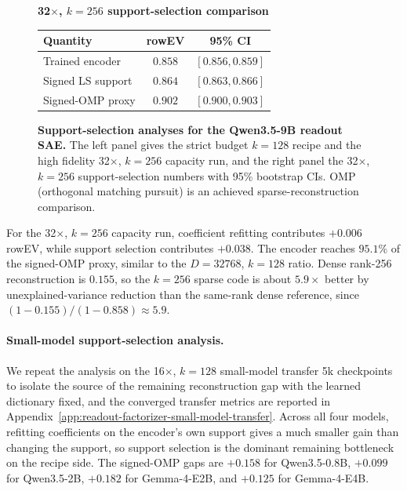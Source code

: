 \begin{figure}[!tbp]
    \centering
    \begin{minipage}[t]{0.60\textwidth}
        \vspace{0pt}
        \centering
    \end{minipage}\hfill
    \begin{minipage}[t]{0.35\textwidth}
        \vspace{0pt}
        \centering
        \scriptsize
        \setlength{\tabcolsep}{4pt}
        \renewcommand{\arraystretch}{1.08}
        \textbf{32$\times$, $k=256$ support-selection comparison}\par\vspace{2pt}
        \begin{tabular}{@{}lcc@{}}
        \toprule
        Quantity & rowEV & 95\% CI \\
        \midrule
        Trained encoder & $0.858$ & $[0.856, 0.859]$ \\
        Signed LS support & $0.864$ & $[0.863, 0.866]$ \\
        Signed-OMP proxy & $0.902$ & $[0.900, 0.903]$ \\
        \bottomrule
        \end{tabular}
    \end{minipage}
    \caption{
        \textbf{Support-selection analyses for the Qwen3.5-9B readout SAE.}
        The left panel gives the strict budget $k=128$ recipe and the high fidelity
        32$\times$, $k=256$ capacity run, and the right panel the 32$\times$, $k=256$
        support-selection numbers with 95\% bootstrap CIs. OMP (orthogonal matching pursuit)
        is an achieved sparse-reconstruction comparison.
    }
    \label{fig:app-k-omp-diagnostic}
\end{figure}

For the 32$\times$, $k=256$ capacity run, coefficient refitting contributes
$+0.006$ rowEV, while support selection contributes $+0.038$. The encoder
reaches $95.1\%$ of the signed-OMP proxy, similar to the $D=32768$, $k=128$
ratio. Dense rank-256 reconstruction is $0.155$, so the $k=256$ sparse code is
about $5.9\times$ better by unexplained-variance reduction than the same-rank
dense reference, since \((1-0.155)/(1-0.858)\approx5.9\).

\paragraph{Small-model support-selection analysis.}
We repeat the analysis on the 16$\times$, $k=128$ small-model transfer 5k
checkpoints to isolate the source of the remaining reconstruction gap with the
learned dictionary fixed, and the converged transfer metrics are reported in
Appendix~\ref{app:readout-factorizer-small-model-transfer}. Across all four models, refitting
coefficients on the encoder's own support gives a much smaller gain than
changing the support, so support selection is the dominant
remaining bottleneck on the recipe side. The signed-OMP gaps are $+0.158$ for
Qwen3.5-0.8B, $+0.099$ for Qwen3.5-2B, $+0.182$ for Gemma-4-E2B, and
$+0.125$ for Gemma-4-E4B.

